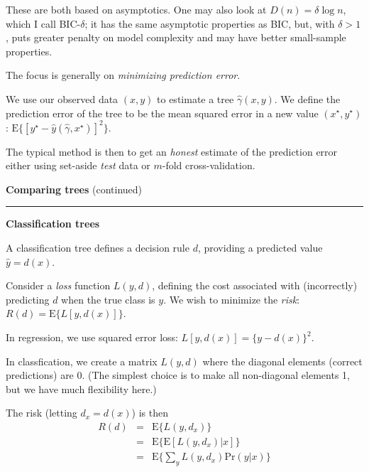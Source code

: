 \documentclass[12pt,letterpaper]{article}
\newcommand{\E}{\text{E}}       %
\renewcommand{\Pr}{\text{Pr}}     %
\newcommand{\HRule}{\rule{\linewidth}{4pt}}
\newcommand{\vsphalf}{\vspace*{0.5cm}}
\begin{document}
These are both based on asymptotics.  One may also look at $D(n)=
\delta \log n$, which I call BIC-$\delta$; it has the same asymptotic
properties as BIC, but, with $\delta > 1$, puts greater penalty on
model complexity and may have better small-sample properties.

\vsphalf

The focus is generally on \emph{minimizing prediction error}.

\bigskip

We use our observed data $(x,y)$ to estimate a tree
$\hat{\gamma}(x,y)$.  We define the prediction error of the tree to be
the mean squared error in a new value $(x^\star, y^\star)$:
$\E\{[y^\star - \hat{y}(\hat{\gamma}, x^\star)]^2\}$.

\bigskip

The typical method is then to get an \emph{honest\/} estimate of the
prediction error either using set-aside \emph{test\/} data or
$m$-fold cross-validation.  





\newpage

\fontsize{30}{30} \selectfont

\centerline{\textbf{Comparing trees} (continued)}

\HRule

\vsphalf

\fontsize{20}{25} \selectfont

\textbf{Classification trees}

\vsphalf

A classification tree defines a decision rule $d$, providing a
predicted value $\hat{y} = d(x)$.

\vsphalf

Consider a \emph{loss\/} function $L(y, d)$, defining the cost
associated with (incorrectly) predicting $d$ when the true class is
$y$.  We wish to minimize the \emph{risk\/}: $R(d) = \E\{L[y,
d(x)]\}$.

\vsphalf

In regression, we use squared error loss: $L[y, d(x)] = \{y -
d(x)\}^2$.  

\vsphalf

In classfication, we create a matrix $L(y,d)$ where the diagonal
elements (correct predictions) are 0.  (The simplest choice is to make
all non-diagonal elements 1, but we have much flexibility here.)

\vsphalf

The risk (letting $d_x = d(x)$) is then
\begin{eqnarray*}
R(d) & = & \E\{L(y,d_x)\} \\
& = & \E \{ \E [ L(y,d_x) | x ] \} \\
& = & \E \{ \sum_y L(y, d_x) \Pr(y | x) \}
\end{eqnarray*}
\end{document}
